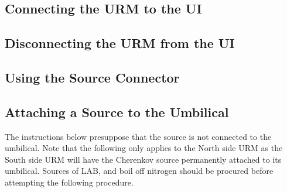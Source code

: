 \subsection{Connecting the URM to the UI}

\subsection{Disconnecting the URM from the UI}

\subsection{Using the Source Connector}

\subsection{Attaching a Source to the Umbilical}\label{ss:sourceattach}

 The instructions below presuppose that the source is not connected to the umbilical. Note that the following only applies to the North side URM as the South side URM will have the Cherenkov source permanently attached to its umbilical. Sources of LAB, and boil off nitrogen should be procured before attempting the following procedure.


